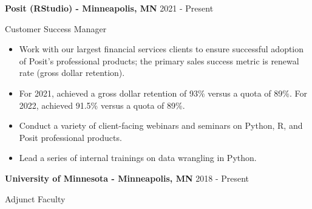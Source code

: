 \documentclass[11pt,a4paper,]{awesome-cv}
\begin{document}
\textbf{Posit (RStudio) - Minneapolis, MN} \hfill 2021 - Present

\vspace{-1ex}

Customer Success Manager

\vspace{-1.5ex}

\small

\begin{itemize}
\item
  Work with our largest financial services clients to ensure successful
  adoption of Posit's professional products; the primary sales success
  metric is renewal rate (gross dollar retention). \vspace{-0.5ex}
\item
  For 2021, achieved a gross dollar retention of 93\% versus a quota of
  89\%. For 2022, achieved 91.5\% versus a quota of 89\%.
  \vspace{-0.5ex}
\item
  Conduct a variety of client-facing webinars and seminars on Python, R,
  and Posit professional products. \vspace{-0.5ex}
\item
  Lead a series of internal trainings on data wrangling in Python.
  \vspace{-0.5ex}
\end{itemize}

\normalsize

\textbf{University of Minnesota - Minneapolis, MN} \hfill 2018 - Present

\vspace{-1ex}

Adjunct Faculty

\vspace{-1.5ex}

\small
\end{document}
